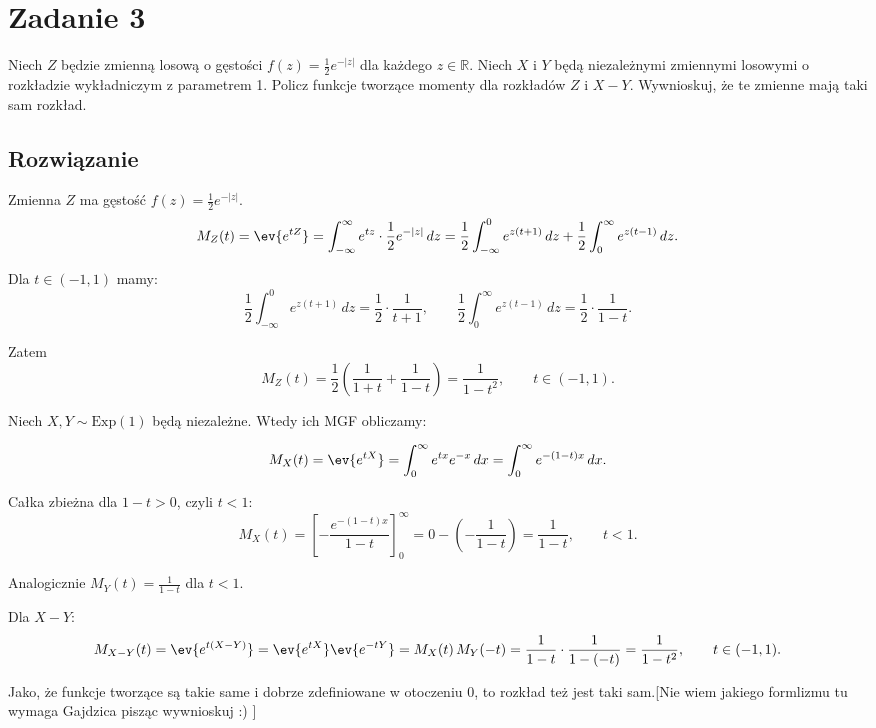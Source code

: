 \section{Zadanie 3}
Niech \(Z\) będzie zmienną losową o gęstości \(f(z) = \frac{1}{2} e^{-|z|}\) dla każdego \(z \in \mathbb{R}\).
Niech \(X\) i \(Y\) będą niezależnymi zmiennymi losowymi o rozkładzie wykładniczym z parametrem 1.
Policz funkcje tworzące momenty dla rozkładów \(Z\) i \(X - Y\).
Wywnioskuj, że te zmienne mają taki sam rozkład.

\subsection*{Rozwiązanie}

Zmienna \(Z\) ma gęstość \(f(z)=\frac12 e^{-|z|}\).
\[
	M_Z(t)=\ev{e^{tZ}}
	=\int_{-\infty}^{\infty} e^{tz}\cdot\frac12 e^{-|z|}\,dz
	=\frac12\int_{-\infty}^{0} e^{z(t+1)}\,dz
	+\frac12\int_{0}^{\infty} e^{z(t-1)}\,dz.
\]

Dla \(t\in(-1,1)\) mamy:
\[
	\frac12\int_{-\infty}^{0} e^{z(t+1)}\,dz = \frac12\cdot\frac{1}{t+1},\qquad
	\frac12\int_{0}^{\infty} e^{z(t-1)}\,dz = \frac12\cdot\frac{1}{1-t}.
\]

Zatem
\[
	M_Z(t)=\frac12\left(\frac{1}{1+t}+\frac{1}{1-t}\right)
	=\frac{1}{1-t^2},\qquad t\in(-1,1).
\]

\medskip

Niech \(X,Y\sim\mathrm{Exp}(1)\) będą niezależne. Wtedy ich MGF obliczamy:

\[
	M_X(t)=\ev{e^{tX}}
	=\int_{0}^{\infty} e^{tx} e^{-x}\,dx
	=\int_{0}^{\infty} e^{-(1-t)x}\,dx.
\]

Całka zbieżna dla \(1-t>0\), czyli \(t<1\):
\[
	M_X(t)=\left[ -\frac{e^{-(1-t)x}}{1-t} \right]_{0}^{\infty}
	=0-\left(-\frac{1}{1-t}\right)=\frac{1}{1-t},\qquad t<1.
\]

Analogicznie \(M_Y(t)=\frac{1}{1-t}\) dla \(t<1\).

Dla \(X-Y\):
\[
	M_{X-Y}(t)=\ev{e^{t(X-Y)}}
	=\ev{e^{tX}}\ev{e^{-tY}}
	=M_X(t)\,M_Y(-t)
	=\frac{1}{1-t}\cdot\frac{1}{1-(-t)}
	=\frac{1}{1-t^2},\qquad t\in(-1,1).
\]

\medskip
Jako, że funkcje tworzące są takie same i dobrze zdefiniowane w otoczeniu 0, to rozkład też jest taki sam.[Nie wiem jakiego formlizmu tu wymaga Gajdzica pisząc wywnioskuj  :) ]